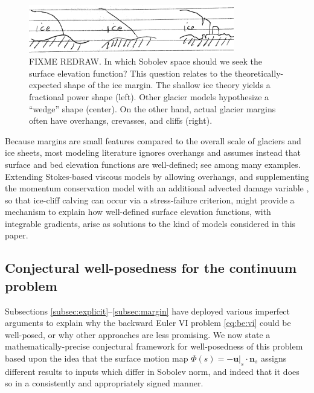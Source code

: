 \documentclass[hidelinks,onefignum,onetabnum,final]{siamart220329}  %
\newcommand{\bn}{\mathbf{n}}
\newcommand{\bu}{\mathbf{u}}
\begin{document}
\begin{figure}[ht]
\begin{center}
\includegraphics[width=0.8\textwidth]{figs/margins.jpg}
\end{center}
\caption{FIXME REDRAW.  In which Sobolev space should we seek the surface elevation function?  This question relates to the theoretically-expected shape of the ice margin.  The shallow ice theory yields a fractional power shape (left).  Other glacier models hypothesize a ``wedge'' shape (center).  On the other hand, actual glacier margins often have overhangs, crevasses, and cliffs (right).}
\label{fig:margins}
\end{figure}

Because margins are small features compared to the overall scale of glaciers and ice sheets, most modeling literature ignores overhangs and assumes instead that surface and bed elevation functions are well-defined; see \cite{IsaacStadlerGhattas2015,Jouvetetal2008,LofgrenAhlkronaHelanow2022,WirbelJarosch2020} among many examples.  Extending Stokes-based viscous models by allowing overhangs, and supplementing the momentum conservation model with an additional advected damage variable \cite{PralongFunk2005}, so that ice-cliff calving can occur via a stress-failure criterion, might provide a mechanism to explain how well-defined surface elevation functions, with integrable gradients, arise as solutions to the kind of models considered in this paper.

\subsection{Conjectural well-posedness for the continuum problem} \label{subsec:conjecture} Subsections \ref{subsec:explicit}--\ref{subsec:margin} have deployed various imperfect arguments to explain why the backward Euler VI problem \eqref{eq:be:vi} could be well-posed, or why other approaches are less promising.  We now state a mathematically-precise conjectural framework for well-posedness of this problem based upon the idea that the surface motion map $\Phi(s) = -\bu|_s\cdot \bn_s$ assigns different results to inputs which differ in Sobolev norm, and indeed that it does so in a consistently and appropriately signed manner.
\end{document}
